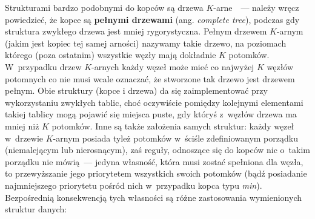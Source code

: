 Strukturami bardzo podobnymi do kopców są drzewa $K$-arne~\cite[$3.1$]{TaDS}~--- należy wręcz powiedzieć, że kopce są \textbf{pełnymi drzewami} (ang. \textit{complete tree}), podczas gdy struktura zwykłego drzewa jest mniej rygorystyczna.
Pełnym drzewem $K$-arnym (jakim jest kopiec tej samej arności) nazywamy takie drzewo, na poziomach którego (poza ostatnim) wszystkie węzły mają dokładnie $K$ potomków.
W~przypadku drzew $K$-arnych każdy węzeł może mieć co najwyżej $K$ węzłów potomnych co nie musi wcale oznaczać, że stworzone tak drzewo jest drzewem pełnym.
Obie struktury (kopce i drzewa) da się zaimplementować przy wykorzystaniu zwykłych tablic, choć oczywiście pomiędzy kolejnymi elementami takiej tablicy mogą pojawić się miejsca puste, gdy któryś z~węzłów drzewa ma mniej niż $K$ potomków.
Inne są także założenia samych struktur: każdy węzeł w~drzewie $K$-arnym posiada tyleż potomków w~ściśle zdefiniowanym porządku (niemalejącym lub nierosnącym), zaś reguły, odnoszące się do kopców nic o~takim porządku nie mówią~--- jedyna własność, która musi zostać spełniona dla węzła, to przewyższanie jego priorytetem wszystkich swoich potomków (bądź posiadanie najmniejszego priorytetu pośród nich w~przypadku kopca typu \textit{min}).
Bezpośrednią konsekwencją tych własności są różne zastosowania wymienionych struktur danych: 

